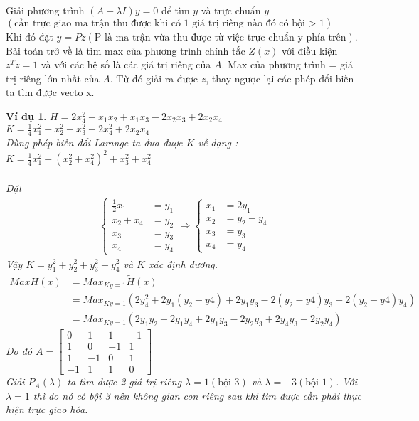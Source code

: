 \documentclass[12pt,a4paper]{book}
\newtheorem{vd}{Ví dụ}
\newcommand{\m}[1]{
\begin{bmatrix}
#1
\end{bmatrix}
}
\newcommand{\n}[1]{
\left(#1\right)
}
\begin{document}
Giải phương trình $\n{A-\lambda I}y = 0$ để tìm $y$ và trực chuẩn $y$ \\$\n{\mbox{cần trực giao ma trận thu được khi có 1 giá trị riêng nào đó có bội > 1}}$ \\
Khi đó đặt $y = Pz \n{\mbox{P là ma trận vừa thu được từ việc trực chuẩn y phía trên}}$. Bài toán trở về là tìm max của phương trình chính tắc $Z\n{x}$ với điều kiện $z^{T}z = 1$ và với các hệ số là các giá trị riêng của $A$. Max của phương trình = giá trị riêng lớn nhất của $A$. Từ đó giải ra được $z$, thay ngược lại các phép đổi biến ta tìm được vecto x.
\begin{vd}
$H = 2x_4^2 + x_1 x_2 + x_1 x_3 - 2x_2 x_3 + 2x_2 x_4$ \\
$K = \frac{1}{4}x_1^2 + x_2^2 + x_3^2 + 2x_4^2 + 2x_2 x_4$ \\
Dùng phép biến đổi Larange ta đưa được $K$ về dạng : \\
$K = \frac{1}{4}x_1^2 + \n{x_2^2 + x_4^2}^2 + x_3^2 + x_4^2$ \\\\
Đặt 
\begin{align}
	\begin{cases}
        \frac{1}{2}x_1 &= y_1 \\
        x_2 + x_4 &= y_2 \\
        x_3 &= y_3 \\
        x_4 &= y_4
    \end{cases}
\Longrightarrow \begin{cases}
        x_1 &= 2y_1 \\
        x_2 &= y_2 - y_4\\
        x_3 &= y_3 \\
        x_4 &= y_4
    \end{cases}
\end{align}
Vậy $K = y_1^2 + y_2^2 + y_3^2 + y_4^2$ và $K$ xác định dương.
\begin{align*}
Max H\n{x} &= Max_{Ky = 1}\tilde{H}\n{x} \\
&= Max_{Ky = 1}\n{2y_4^2 + 2y_1\n{y_2 - y4} + 2y_1 y_3 - 2\n{y_2 - y4}y_3 + 2\n{y_2 - y4}y_4} \\
&= Max_{Ky = 1}\n{2y_1 y_2 - 2y_1 y_4 + 2y_1 y_3 - 2y_2 y_3 + 2y_4 y_3 + 2y_2 y_4}
\end{align*}
Do đó
$A = \m{
0 & 1 & 1 & -1\\
1 & 0 & -1 & 1\\
1 & -1 & 0 & 1\\
-1 & 1 & 1 & 0
}$ \\
Giải $P_A\n{\lambda}$ ta tìm được 2 giá trị riêng $\lambda = 1\n{\mbox{bội 3}}$ và $\lambda = -3\n{\mbox{bội 1}}$. Với $\lambda = 1$ thì do nó có bội 3 nên không gian con riêng sau khi tìm được cần phải thực hiện trực giao hóa. \\

\end{vd}
\end{document}
